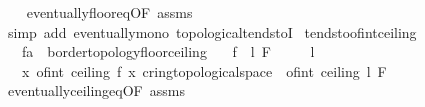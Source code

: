 \begin{isabellebody}
%
\isadelimproof
\ \ %
\endisadelimproof
%
\isatagproof
{}\isamarkupfalse%
\ eventually{\isacharunderscore}{\kern0pt}floor{\isacharunderscore}{\kern0pt}eq{\isacharbrackleft}{\kern0pt}OF\ assms{\isacharbrackright}{\kern0pt}\isanewline
\ \ \isamarkupfalse%
\ {\isacharparenleft}{\kern0pt}simp\ add{\isacharcolon}{\kern0pt}\ eventually{\isacharunderscore}{\kern0pt}mono\ topological{\isacharunderscore}{\kern0pt}tendstoI{\isacharparenright}{\kern0pt}%
\endisatagproof
{\isafoldproof}%
%
\isadelimproof
\isanewline
%
\endisadelimproof
\isanewline
{}\isamarkupfalse%
\ tendsto{\isacharunderscore}{\kern0pt}of{\isacharunderscore}{\kern0pt}int{\isacharunderscore}{\kern0pt}ceiling{\isacharcolon}{\kern0pt}\isanewline
\ \ \ f{\isacharcolon}{\kern0pt}{\isacharcolon}{\kern0pt}{\isachardoublequoteopen}{\isacharprime}{\kern0pt}a\ {\isasymRightarrow}\ {\isacharprime}{\kern0pt}b{\isacharcolon}{\kern0pt}{\isacharcolon}{\kern0pt}{\isacharbraceleft}{\kern0pt}order{\isacharunderscore}{\kern0pt}topology{\isacharcomma}{\kern0pt}floor{\isacharunderscore}{\kern0pt}ceiling{\isacharbraceright}{\kern0pt}{\isachardoublequoteclose}\isanewline
\ \ \ {\isachardoublequoteopen}{\isacharparenleft}{\kern0pt}f\ {\isasymlonglongrightarrow}\ l{\isacharparenright}{\kern0pt}\ F{\isachardoublequoteclose}\isanewline
\ \ \ \ \ {\isachardoublequoteopen}l\ {\isasymnotin}\ {\isasymint}{\isachardoublequoteclose}\isanewline
\ \ \ {\isachardoublequoteopen}{\isacharparenleft}{\kern0pt}{\isacharparenleft}{\kern0pt}{\isasymlambda}x{\isachardot}{\kern0pt}\ of{\isacharunderscore}{\kern0pt}int\ {\isacharparenleft}{\kern0pt}ceiling\ {\isacharparenleft}{\kern0pt}f\ x{\isacharparenright}{\kern0pt}{\isacharparenright}{\kern0pt}{\isacharcolon}{\kern0pt}{\isacharcolon}{\kern0pt}\ {\isacharprime}{\kern0pt}c{\isacharcolon}{\kern0pt}{\isacharcolon}{\kern0pt}{\isacharbraceleft}{\kern0pt}ring{\isacharunderscore}{\kern0pt}{}{\isacharcomma}{\kern0pt}topological{\isacharunderscore}{\kern0pt}space{\isacharbraceright}{\kern0pt}{\isacharparenright}{\kern0pt}\ {\isasymlonglongrightarrow}\ of{\isacharunderscore}{\kern0pt}int\ {\isacharparenleft}{\kern0pt}ceiling\ l{\isacharparenright}{\kern0pt}{\isacharparenright}{\kern0pt}\ F{\isachardoublequoteclose}\isanewline
%
\isadelimproof
\ \ %
\endisadelimproof
%
\isatagproof
{}\isamarkupfalse%
\ eventually{\isacharunderscore}{\kern0pt}ceiling{\isacharunderscore}{\kern0pt}eq{\isacharbrackleft}{\kern0pt}OF\ assms{\isacharbrackright}{\kern0pt}\isanewline

\end{isabellebody}
